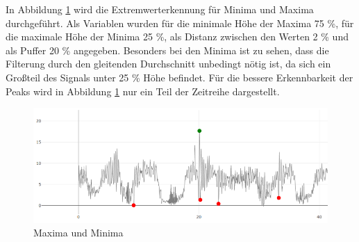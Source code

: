 In Abbildung \ref{fig:peaks} wird die Extremwerterkennung für Minima und Maxima durchgeführt. Als Variablen wurden für die minimale Höhe der Maxima 75 \%, für die maximale Höhe der Minima 25 \%, als Distanz zwischen den Werten 2 \% und als Puffer 20 \% angegeben. Besonders bei den Minima ist zu sehen, dass die Filterung durch den gleitenden Durchschnitt unbedingt nötig ist, da sich ein Großteil des Signals unter 25 \% Höhe befindet. Für die bessere Erkennbarkeit der Peaks wird in Abbildung \ref{fig:peaks} nur ein Teil der Zeitreihe dargestellt.
\begin{figure}[h!]
\centering
\includegraphics[width=\textwidth]{gfx/peaks.png}
\caption{Maxima und Minima}
\label{fig:peaks}
\end{figure}


